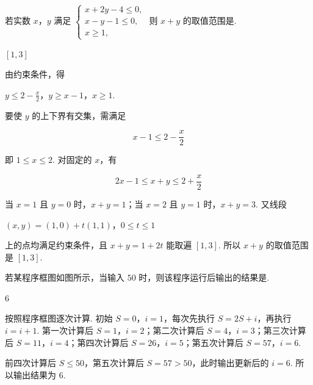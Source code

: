 \begin{problem}
若实数 \(x\)，\(y\) 满足 \(\begin{cases}
x + 2y - 4 \leqslant 0,\\
x - y - 1 \leqslant 0,\\
x \geqslant 1,
\end{cases}\) 则 \(x + y\) 的取值范围是\fillinblank{}.
\end{problem}

\begin{answer}
\([1,3]\)
\end{answer}

\begin{solution}
由约束条件，得

\(y\leqslant2-\frac{x}{2}\)，\(y\geqslant x-1\)，\(x\geqslant1\).

要使 \(y\) 的上下界有交集，需满足

\[
x-1\leqslant2-\frac{x}{2}
\]

即 \(1\leqslant x\leqslant2\). 对固定的 \(x\)，有

\[
2x-1\leqslant x+y\leqslant2+\frac{x}{2}
\]

当 \(x=1\) 且 \(y=0\) 时，\(x+y=1\)；当 \(x=2\) 且 \(y=1\) 时，\(x+y=3\). 又线段

\((x,y)=(1,0)+t(1,1)\)，\(0\leqslant t\leqslant1\)

上的点均满足约束条件，且 \(x+y=1+2t\) 能取遍 \([1,3]\). 所以 \(x+y\) 的取值范围是 \([1,3]\).
\end{solution}

\begin{problem}
若某程序框图如图所示，当输入 \(50\) 时，则该程序运行后输出的结果是\fillinblank{}.

\end{problem}

\begin{answer}
\(6\)
\end{answer}

\begin{solution}
按照程序框图逐次计算. 初始 \(S=0\)，\(i=1\)，每次先执行 \(S=2S+i\)，再执行 \(i=i+1\). 第一次计算后 \(S=1\)，\(i=2\)；第二次计算后 \(S=4\)，\(i=3\)；第三次计算后 \(S=11\)，\(i=4\)；第四次计算后 \(S=26\)，\(i=5\)；第五次计算后 \(S=57\)，\(i=6\).

前四次计算后 \(S\leqslant50\)，第五次计算后 \(S=57>50\)，此时输出更新后的 \(i=6\). 所以输出结果为 \(6\).
\end{solution}

